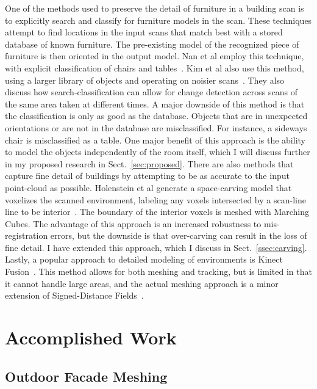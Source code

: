 \documentclass[journal]{IEEEtran}
\begin{document}
One of the methods used to preserve the detail of furniture in a building scan is to explicitly search and classify for furniture models in the scan.  These techniques attempt to find locations in the input scans that match best with a stored database of known furniture.  The pre-existing model of the recognized piece of furniture is then oriented in the output model.  Nan et al employ this technique, with explicit classification of chairs and tables~\cite{SearchClassifyPointcloud}.  Kim et al also use this method, using a larger library of objects and operating on noisier scans~\cite{Kim12}.  They also discuss how search-classification can allow for change detection across scans of the same area taken at different times.  A major downside of this method is that the classification is only as good as the database.  Objects that are in unexpected orientations or are not in the database are misclassified.  For instance, a sideways chair is misclassified as a table.  One major benefit of this approach is the ability to model the objects independently of the room itself, which I will discuss further in my proposed research in Sect.~\ref{sec:proposed}.  There are also methods that capture fine detail of buildings by attempting to be as accurate to the input point-cloud as possible.  Holenstein et al generate a space-carving model that voxelizes the scanned environment, labeling any voxels intersected by a scan-line line to be interior~\cite{Carving}.  The boundary of the interior voxels is meshed with Marching Cubes.  The advantage of this approach is an increased robustness to mis-registration errors, but the downside is that over-carving can result in the loss of fine detail.  I have extended this approach, which I discuss in Sect.~\ref{ssec:carving}.  Lastly, a popular approach to detailed modeling of environments is Kinect Fusion~\cite{KinectFusion,Kintinuous}.  This method allows for both meshing and tracking, but is limited in that it cannot handle large areas, and the actual meshing approach is a minor extension of Signed-Distance Fields~\cite{SignedDistanceFields}. 

\section{Accomplished Work}
\label{sec:accomplished}

%
%

\subsection{Outdoor Facade Meshing}
\label{ssec:facade}
\end{document}
